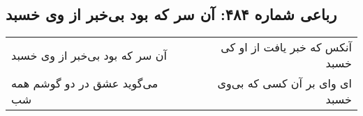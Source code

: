 \begin{center}
\section*{رباعی شماره ۴۸۴: آن سر که بود بی‌خبر از وی خسبد}
\label{sec:0484}
\begin{longtable}{l p{0.5cm} r}
آن سر که بود بی‌خبر از وی خسبد
&&
آنکس که خبر یافت از او کی خسبد
\\
می‌گوید عشق در دو گوشم همه شب
&&
ای وای بر آن کسی که بی‌وی خسبد
\\
\end{longtable}
\end{center}
